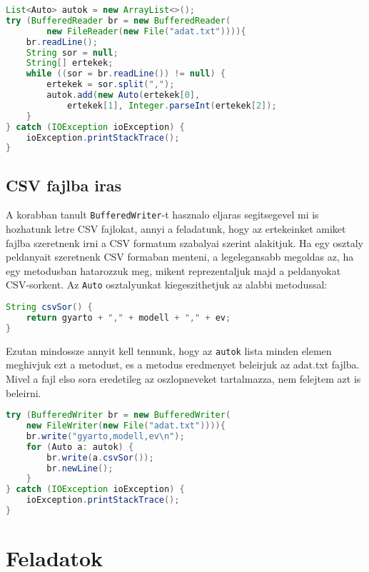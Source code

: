 \documentclass{article}
\let\l\lstinline
\begin{document}
\begin{lstlisting}[language=Java, caption=Sorok betoltese objektumokkent]
List<Auto> autok = new ArrayList<>();
try (BufferedReader br = new BufferedReader(
        new FileReader(new File("adat.txt")))){
    br.readLine();
    String sor = null;
    String[] ertekek;
    while ((sor = br.readLine()) != null) {
        ertekek = sor.split(",");
        autok.add(new Auto(ertekek[0],
            ertekek[1], Integer.parseInt(ertekek[2]);
    }
} catch (IOException ioException) {
    ioException.printStackTrace();
}
\end{lstlisting}

\subsection{CSV fajlba iras}

A korabban tanult \l{BufferedWriter}-t hasznalo eljaras segitsegevel mi is hozhatunk letre CSV fajlokat, annyi a feladatunk, hogy az ertekeinket amiket fajlba szeretnenk irni a CSV formatum szabalyai szerint alakitjuk. Ha egy osztaly peldanyait szeretnenk CSV formaban menteni, a legelegansabb megoldas az, ha egy metodusban hatarozzuk meg, mikent reprezentaljuk majd a peldanyokat CSV-sorkent. Az \l{Auto} osztalyunkat kiegeszithetjuk az alabbi metodussal:

\begin{lstlisting}[language=Java, caption=Metodus CSV sor letrehozasahoz]
String csvSor() {
    return gyarto + "," + modell + "," + ev;
}
\end{lstlisting}

\newpage

Ezutan mindossze annyit kell tennunk, hogy az \l{autok} lista minden elemen meghivjuk ezt a metodust, es a metodus eredmenyet beleirjuk az adat.txt fajlba. Mivel a fajl elso sora eredetileg az oszlopneveket tartalmazza, nem felejtem azt is beleirni.

\begin{lstlisting}[language=Java, caption=Autok visszairasa a CSV fajlba]
try (BufferedWriter br = new BufferedWriter(
    new FileWriter(new File("adat.txt")))){
    br.write("gyarto,modell,ev\n");
    for (Auto a: autok) {
        br.write(a.csvSor());
        br.newLine();
    }
} catch (IOException ioException) {
    ioException.printStackTrace();
}
\end{lstlisting}

\newpage
\section{Feladatok}
\end{document}
